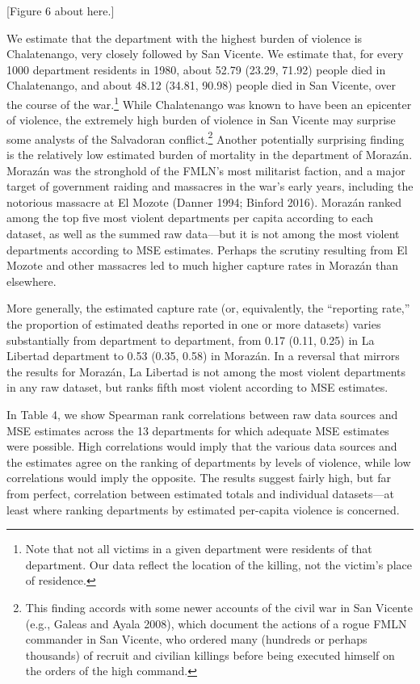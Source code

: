 \documentclass[11pt,]{article}
\let\rmarkdownfootnote\footnote%
\def\footnote{\protect\rmarkdownfootnote}
\begin{document}
{[}Figure 6 about here.{]}

We estimate that the department with the highest burden of violence is
Chalatenango, very closely followed by San Vicente. We estimate that,
for every 1000 department residents in 1980, about 52.79 (23.29, 71.92)
people died in Chalatenango, and about 48.12 (34.81, 90.98) people died
in San Vicente, over the course of the war.\footnote{Note that not all
  victims in a given department were residents of that department. Our
  data reflect the location of the killing, not the victim's place of
  residence.} While Chalatenango was known to have been an epicenter of
violence, the extremely high burden of violence in San Vicente may
surprise some analysts of the Salvadoran conflict.\footnote{This finding
  accords with some newer accounts of the civil war in San Vicente
  (e.g., Galeas and Ayala 2008), which document the actions of a rogue
  FMLN commander in San Vicente, who ordered many (hundreds or perhaps
  thousands) of recruit and civilian killings before being executed
  himself on the orders of the high command.} Another potentially
surprising finding is the relatively low estimated burden of mortality
in the department of Morazán. Morazán was the stronghold of the FMLN's
most militarist faction, and a major target of government raiding and
massacres in the war's early years, including the notorious massacre at
El Mozote (Danner 1994; Binford 2016). Morazán ranked among the top five
most violent departments per capita according to each dataset, as well
as the summed raw data---but it is not among the most violent
departments according to MSE estimates. Perhaps the scrutiny resulting
from El Mozote and other massacres led to much higher capture rates in
Morazán than elsewhere.

More generally, the estimated capture rate (or, equivalently, the
``reporting rate,'' the proportion of estimated deaths reported in one
or more datasets) varies substantially from department to department,
from 0.17 (0.11, 0.25) in La Libertad department to 0.53 (0.35, 0.58) in
Morazán. In a reversal that mirrors the results for Morazán, La Libertad
is not among the most violent departments in any raw dataset, but ranks
fifth most violent according to MSE estimates.

In Table 4, we show Spearman rank correlations between raw data sources
and MSE estimates across the 13 departments for which adequate MSE
estimates were possible. High correlations would imply that the various
data sources and the estimates agree on the ranking of departments by
levels of violence, while low correlations would imply the opposite. The
results suggest fairly high, but far from perfect, correlation between
estimated totals and individual datasets---at least where ranking
departments by estimated per-capita violence is concerned.
\end{document}
